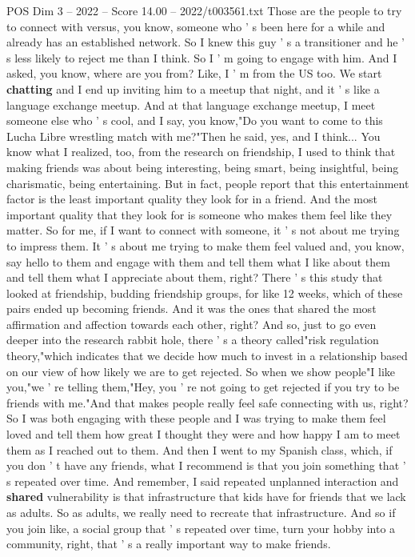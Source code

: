 \begin{textsample}{POS Dim 3 – 2022 – Score 14.00 – 2022/t003561.txt}
Those are the people to try to connect with versus, you know, someone who ' s been here for a while and already has an established network.
So I knew this guy ' s a transitioner and he ' s less likely to reject me than I think.
So I ' m going to engage with him.
And I asked, you know, where are you from?
Like, I ' m from the US too.
We start \textbf{chatting} and I end up inviting him to a meetup that night, and it ' s like a language exchange meetup.
And at that language exchange meetup, I meet someone else who ' s cool, and I say, you know,"Do you want to come to this Lucha Libre wrestling match with me?"Then he said, yes, and I think...
You know what I realized, too, from the research on friendship, I used to think that making friends was about being interesting, being smart, being insightful, being charismatic, being entertaining.
But in fact, people report that this entertainment factor is the least important quality they look for in a friend.
And the most important quality that they look for is someone who makes them feel like they matter.
So for me, if I want to connect with someone, it ' s not about me trying to impress them.
It ' s about me trying to make them feel valued and, you know, say hello to them and engage with them and tell them what I like about them and tell them what I appreciate about them, right?
There ' s this study that looked at friendship, budding friendship groups, for like 12 weeks, which of these pairs ended up becoming friends.
And it was the ones that shared the most affirmation and affection towards each other, right?
And so, just to go even deeper into the research rabbit hole, there ' s a theory called"risk regulation theory,"which indicates that we decide how much to invest in a relationship based on our view of how likely we are to get rejected.
So when we show people"I like you,"we ' re telling them,"Hey, you ' re not going to get rejected if you try to be friends with me."And that makes people really feel safe connecting with us, right?
So I was both engaging with these people and I was trying to make them feel loved and tell them how great I thought they were and how happy I am to meet them as I reached out to them.
And then I went to my Spanish class, which, if you don ' t have any friends, what I recommend is that you join something that ' s repeated over time.
And remember, I said repeated unplanned interaction and \textbf{shared} vulnerability is that infrastructure that kids have for friends that we lack as adults.
So as adults, we really need to recreate that infrastructure.
And so if you join like, a social group that ' s repeated over time, turn your hobby into a community, right, that ' s a really important way to make friends.

\end{textsample}
